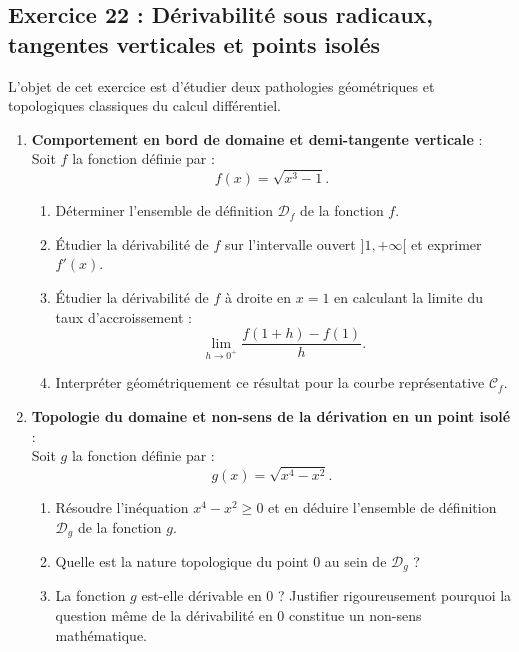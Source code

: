 \documentclass[11pt,a4paper]{article}
\begin{document}
\subsection*{Exercice 22 : Dérivabilité sous radicaux, tangentes verticales et points isolés}

L'objet de cet exercice est d'étudier deux pathologies géométriques et topologiques classiques du calcul différentiel.
\begin{enumerate}[label=\textbf{\arabic*.}]
    \item \textbf{Comportement en bord de domaine et demi-tangente verticale} :\\
    Soit $f$ la fonction définie par :
    \[
    f(x) = \sqrt{x^3 - 1}.
    \]
    \begin{enumerate}[label=\alph*.]
        \item Déterminer l'ensemble de définition $\mathcal{D}_f$ de la fonction $f$.
        \item Étudier la dérivabilité de $f$ sur l'intervalle ouvert $]1, +\infty[$ et exprimer $f'(x)$.
        \item Étudier la dérivabilité de $f$ à droite en $x = 1$ en calculant la limite du taux d'accroissement :
        \[
        \lim_{h \to 0^+} \frac{f(1+h) - f(1)}{h}.
        \]
        \item Interpréter géométriquement ce résultat pour la courbe représentative $\mathcal{C}_f$.
    \end{enumerate}

    \item \textbf{Topologie du domaine et non-sens de la dérivation en un point isolé} :\\
    Soit $g$ la fonction définie par :
    \[
    g(x) = \sqrt{x^4 - x^2}.
    \]
    \begin{enumerate}[label=\alph*.]
        \item Résoudre l'inéquation $x^4 - x^2 \ge 0$ et en déduire l'ensemble de définition $\mathcal{D}_g$ de la fonction $g$.
        \item Quelle est la nature topologique du point $0$ au sein de $\mathcal{D}_g$ ?
        \item La fonction $g$ est-elle dérivable en $0$ ? Justifier rigoureusement pourquoi la question même de la dérivabilité en $0$ constitue un non-sens mathématique.
    \end{enumerate}
\end{enumerate}
\end{document}

